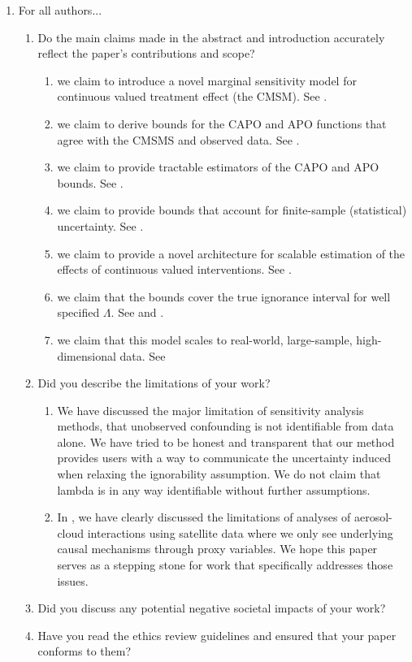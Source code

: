 \documentclass{article}
\begin{document}
\begin{enumerate}


\item For all authors...
\begin{enumerate}
  \item Do the main claims made in the abstract and introduction accurately reflect the paper's contributions and scope?
    \answerYes{}
    \begin{enumerate}
        \item we claim to introduce a novel marginal sensitivity model for continuous valued treatment effect (the CMSM). See .
        \item we claim to derive bounds for the CAPO and APO functions that agree with the CMSMS and observed data. See .
        \item we claim to provide tractable estimators of the CAPO and APO bounds. See .
        \item we claim to provide bounds that account for finite-sample (statistical) uncertainty. See .
        \item we claim to provide a novel architecture for scalable estimation of the effects of continuous valued interventions. See .
        \item we claim that the bounds cover the true ignorance interval for well specified $\Lambda$. See  and .
        \item we claim that this model scales to real-world, large-sample, high-dimensional data. See 
    \end{enumerate}
  \item Did you describe the limitations of your work?
    \answerYes{}
    \begin{enumerate}
        \item We have discussed the major limitation of sensitivity analysis methods, that unobserved confounding is not identifiable from data alone. We have tried to be honest and transparent that our method provides users with a way to communicate the uncertainty induced when relaxing the ignorability assumption.
        We do not claim that lambda is in any way identifiable without further assumptions.
        \item In , we have clearly discussed the limitations of analyses of aerosol-cloud interactions using satellite data where we only see underlying causal mechanisms through proxy variables. We hope this paper serves as a stepping stone for work that specifically addresses those issues.
    \end{enumerate}
  \item Did you discuss any potential negative societal impacts of your work?
    \answerYes{}
  \item Have you read the ethics review guidelines and ensured that your paper conforms to them?
    \answerYes{}
\end{enumerate}



\end{enumerate}
\end{document}
